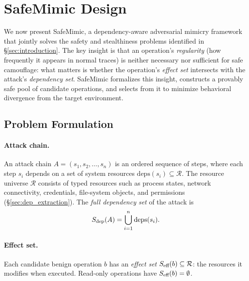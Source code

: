 \section{SafeMimic Design}
\label{sec:design}

We now present SafeMimic, a dependency-aware adversarial mimicry framework
that jointly solves the safety and stealthiness problems identified in
\S\ref{sec:introduction}. The key insight is that an operation's
\emph{regularity} (how frequently it appears in normal traces) is neither
necessary nor sufficient for safe camouflage: what matters is whether the
operation's \emph{effect set} intersects with the attack's \emph{dependency
set}. SafeMimic formalizes this insight, constructs a provably safe pool of
candidate operations, and selects from it to minimize behavioral divergence
from the target environment.

\subsection{Problem Formulation}
\label{sec:formulation}

\paragraph{Attack chain.}
An attack chain $A = (s_1, s_2, \ldots, s_n)$ is an ordered sequence of
steps, where each step $s_i$ depends on a set of system resources
$\mathrm{deps}(s_i) \subseteq \mathcal{R}$. The resource universe
$\mathcal{R}$ consists of typed resources such as process states, network
connectivity, credentials, file-system objects, and permissions
(\S\ref{sec:dep_extraction}). The \emph{full dependency set} of the attack
is
\begin{equation}
  S_{\text{dep}}(A) = \bigcup_{i=1}^{n} \mathrm{deps}(s_i).
  \label{eq:sdep}
\end{equation}

\paragraph{Effect set.}
Each candidate benign operation $b$ has an \emph{effect set}
$S_{\text{eff}}(b) \subseteq \mathcal{R}$: the resources it modifies when
executed. Read-only operations have $S_{\text{eff}}(b) = \emptyset$.

